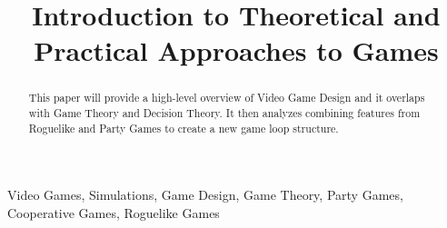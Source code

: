 \title{Introduction to Theoretical and Practical Approaches to Games\\
}

\author{
}

\maketitle

\begin{abstract}
This paper will provide a high-level overview of Video Game
Design and it overlaps with Game Theory and Decision Theory.
It then analyzes combining features from Roguelike and Party
Games to create a new game loop structure.
\end{abstract}

\begin{IEEEkeywords}
Video Games, Simulations, Game Design, Game Theory, Party Games, Cooperative Games, Roguelike Games
\end{IEEEkeywords}